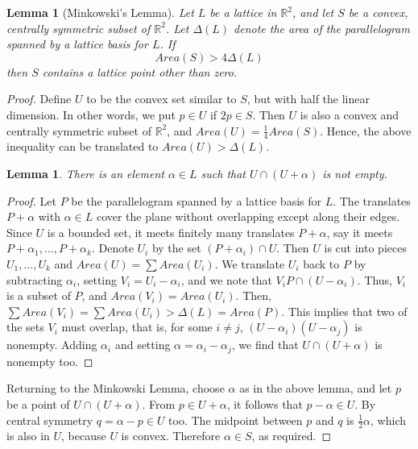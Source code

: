 \documentclass[12pt]{article}
\newtheorem{lem}[thm]{Lemma}  %
\theoremstyle{definition}
\theoremstyle{remark}
\numberwithin{equation}{section}
\newcommand\R{\mathbb R}    %
\begin{document}
\begin{lem}[Minkowski's Lemma]
        Let $L$ be a lattice in $\R^2$, and let $S$ be a convex, centrally symmetric subset of $\R^2$. Let $\Delta(L)$ denote the area of the parallelogram spanned by a lattice basis for $L$. If \begin{equation}
                Area(S) > 4\Delta(L)
        \end{equation}
        then $S$ contains a lattice point other than zero.
\end{lem}
\begin{proof}
        Define $U$ to be the convex set similar to $S$, but with half the linear dimension. In other words, we put $p \in U$ if $2p \in S$. Then $U$ is also a convex and centrally symmetric subset of $\R^2$, and $Area(U) = \frac{1}{4}Area(S)$. Hence, the above inequality can be translated to $Area(U) > \Delta(L)$.


        \begin{lem}
                There is an element $\alpha \in L$ such that $U \cap (U+\alpha)$ is not empty.
        \end{lem}
        \begin{proof}
                Let $P$ be the parallelogram spanned by a lattice basis for $L$. The translates $P+\alpha$ with $\alpha \in L$ cover the plane without overlapping except along their edges. Since $U$ is a bounded set, it meets finitely many translates $P+\alpha$, say it meets $P +\alpha_1,...,P+\alpha_k$. Denote $U_i$ by the set $(P+\alpha_i) \cap U$. Then $U$ is cut into pieces $U_1,...,U_k$ and $Area(U) = \sum Area(U_i)$. We translate $U_i$ back to $P$ by subtracting $\alpha_i$, setting $V_i = U_i - \alpha_i$, and we note that $V_i P\cap (U- \alpha_i)$. Thus, $V_i$ is a subset of $P$, and $Area(V_i) = Area(U_i)$. Then, $\sum Area(V_i) = \sum Area(U_i) > \Delta(L) = Area(P)$. This implies that two of the sets $V_i$ must overlap, that is, for some $i \neq j$, $(U-\alpha_i)(U-\alpha_j)$ is nonempty. Adding $\alpha_i$ and setting $\alpha = \alpha_i - \alpha_j$, we find that $U \cap (U + \alpha)$ is nonempty too.
        \end{proof}



        Returning to the Minkowski Lemma, choose $\alpha$ as in the above lemma, and let $p$ be a point of $U\cap (U+\alpha)$. From $p \in U + \alpha$, it follows that $p - \alpha \in U$. By central symmetry $q = \alpha - p \in U$ too. The midpoint between $p$ and $q$ is $\frac{1}{2}\alpha$, which is also in $U$, because $U$ is convex. Therefore $\alpha \in S$, as required.
\end{proof}
\end{document}
